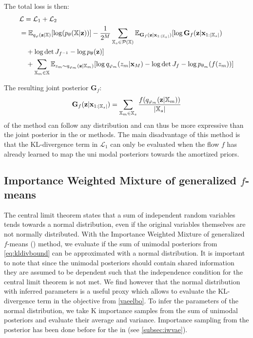 The total loss is then:
\begin{equation}
    \begin{split}
        &\mathcal{L} = \mathcal{L}_1 + \mathcal{L}_2\\
        &= \mathbb{E}_{q_{\varphi}(\textbf{z}|\mathbb{X})}[\log (p_{\theta}(\mathbb{X}|\textbf{z}))] - \frac{1}{2^M} \sum _{\mathbb{X}_s \in \mathcal{P}(\mathbb{X})} \mathbb{E}_{\textbf{G}_f(\textbf{z}|\textbf{x}_{1:|\mathbb{X}_s|})}[\log \textbf{G}_f(\textbf{z}|\textbf{x}_{1:|\mathbb{X}_s|})\\
        &\quad + \log \det J_{f^{-1}}- \log p_{\theta}(\textbf{z}) ]\\
        &\quad + \sum _{\mathbb{X}_m \in \mathbb{X}} \mathbb{E}_{z_m \sim q_{\varphi_m}(\textbf{z}|\mathbb{X}_m)} [\log q_{\varphi_m}(z_m|\textbf{x}_M) - \log \det J_f  - \log p_{\theta_m}(f(z_m))]
    \end{split}
\end{equation}

The resulting joint posterior $\textbf{G}_f$:
\begin{equation}
    \textbf{G}_f(\textbf{z}|\textbf{x}_{1:|\mathbb{X}_s|}) =\sum _{\mathbb{X}_m \in \mathbb{X}_s} \frac{f(q_{\varphi_m}(\textbf{z}|\mathbb{X}_m))}{|\mathbb{X}_s|}
\end{equation}
of the  method can follow any distribution and can thus be more expressive than the joint posterior in the  or  methods.
The main disadvantage of this method is that the KL-divergence term in $\mathcal{L}_1$ can only be evaluated when the flow $f$ has already learned to map the uni modal posteriors towards the amortized priors.



\subsection{Importance Weighted Mixture of generalized $f$-means} \label{subsubsec:iwMogfM}
The central limit theorem states that a sum of independent random variables tends towards a normal distribution, even if the original variables themselves are not normally distributed.
With the Importance Weighted Mixture of generalized $f$-means () method, we evaluate if the sum of unimodal posteriors from \cref{eq:kldivbound} can be approximated with a normal distribution.
It is important to note that since the unimodal posteriors should contain shared information they are assumed to be dependent such that the independence condition for the central limit theorem is not met.
We find however that the normal distribution with inferred parameters is a useful proxy which allows to evaluate the KL-divergence term in the objective from \cref{vaeelbo}.
To infer the parameters of the normal distribution, we take K importance samples from the sum of unimodal posteriors and evaluate their average and variance.
Importance sampling from the posterior has been done before for the  in \cite{burda_importance_2016} (see \cref{subsec:iwvae}).

